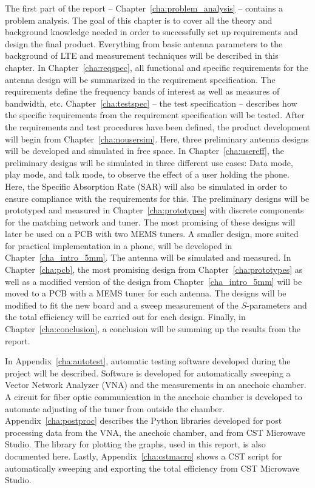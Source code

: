 The first part of the report -- Chapter~\ref{cha:problem_analysis} -- contains a problem analysis. The goal of this chapter is to cover all the theory and background knowledge needed in order to successfully set up requirements and design the final product. Everything from basic antenna parameters to the background of LTE and measurement techniques will be described in this chapter. 
In Chapter~\ref{cha:reqspec}, all functional and specific requirements for the antenna design will be summarized in the requirement specification. The requirements define the frequency bands of interest as well as measures of bandwidth, etc. 
Chapter~\ref{cha:testspec} -- the test specification -- describes how the specific requirements from the requirement specification will be tested.
After the requirements and test procedures have been defined, the product development will begin from Chapter~\ref{cha:nousersim}. Here, three preliminary antenna designs will be developed and simulated in free space. 
In Chapter~\ref{cha:usereff}, the preliminary designs will be simulated in three different use cases: Data mode, play mode, and talk mode, to observe the effect of a user holding the phone. Here, the Specific Absorption Rate (SAR) will also be simulated in order to ensure compliance with the requirements for this.
The preliminary designs will be prototyped and measured in Chapter~\ref{cha:prototypes} with discrete components for the matching network and tuner. The most promising of these designs will later be used on a PCB with two MEMS tuners.
A smaller design, more suited for practical implementation in a phone, will be developed in Chapter~\ref{cha_intro_5mm}. The antenna will be simulated and measured.
In Chapter~\ref{cha:pcb}, the most promising design from Chapter~\ref{cha:prototypes} as well as a modified version of the design from Chapter~\ref{cha_intro_5mm} will be moved to a PCB with a MEMS tuner for each antenna. The designs will be modified to fit the new board and a sweep measurement of the $S$-parameters and the total efficiency will be carried out for each design.
Finally, in Chapter~\ref{cha:conclusion}, a conclusion will be summing up the results from the report.

In Appendix~\ref{cha:autotest}, automatic testing software developed during the project will be described. Software is developed for automatically sweeping a Vector Network Analyzer (VNA) and the measurements in an anechoic chamber. A circuit for fiber optic communication in the anechoic chamber is developed to automate adjusting of the tuner from outside the chamber.
Appendix~\ref{cha:postproc} describes the Python libraries developed for post processing data from the VNA, the anechoic chamber, and from CST Microwave Studio. The library for plotting the graphs, used in this report, is also documented here.
Lastly, Appendix~\ref{cha:cstmacro} shows a CST script for automatically sweeping and exporting the total efficiency from CST Microwave Studio.


